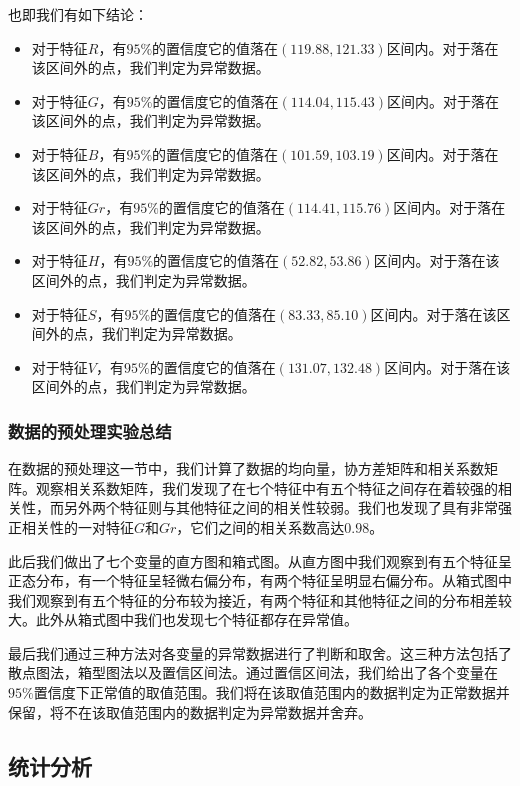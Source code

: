 \documentclass[UTF8]{ctexart}
\begin{document}
	也即我们有如下结论：
	\begin{itemize}
		\item 对于特征$R$，有$95\%$的置信度它的值落在$(119.88, 121.33)$区间内。对于落在该区间外的点，我们判定为异常数据。
		\item 对于特征$G$，有$95\%$的置信度它的值落在$(114.04, 115.43)$区间内。对于落在该区间外的点，我们判定为异常数据。
		\item 对于特征$B$，有$95\%$的置信度它的值落在$(101.59, 103.19)$区间内。对于落在该区间外的点，我们判定为异常数据。
		\item 对于特征$Gr$，有$95\%$的置信度它的值落在$(114.41, 115.76)$区间内。对于落在该区间外的点，我们判定为异常数据。
		\item 对于特征$H$，有$95\%$的置信度它的值落在$(52.82, 53.86)$区间内。对于落在该区间外的点，我们判定为异常数据。
		\item 对于特征$S$，有$95\%$的置信度它的值落在$(83.33, 85.10)$区间内。对于落在该区间外的点，我们判定为异常数据。
		\item 对于特征$V$，有$95\%$的置信度它的值落在$(131.07, 132.48)$区间内。对于落在该区间外的点，我们判定为异常数据。
	\end{itemize} 

	\subsubsection{数据的预处理实验总结}
	在数据的预处理这一节中，我们计算了数据的均向量，协方差矩阵和相关系数矩阵。观察相关系数矩阵，我们发现了在七个特征中有五个特征之间存在着较强的相关性，而另外两个特征则与其他特征之间的相关性较弱。我们也发现了具有非常强正相关性的一对特征$G$和$Gr$，它们之间的相关系数高达$0.98$。
	
	此后我们做出了七个变量的直方图和箱式图。从直方图中我们观察到有五个特征呈正态分布，有一个特征呈轻微右偏分布，有两个特征呈明显右偏分布。从箱式图中我们观察到有五个特征的分布较为接近，有两个特征和其他特征之间的分布相差较大。此外从箱式图中我们也发现七个特征都存在异常值。
	
	最后我们通过三种方法对各变量的异常数据进行了判断和取舍。这三种方法包括了散点图法，箱型图法以及置信区间法。通过置信区间法，我们给出了各个变量在$95\%$置信度下正常值的取值范围。我们将在该取值范围内的数据判定为正常数据并保留，将不在该取值范围内的数据判定为异常数据并舍弃。
	
	\subsection{统计分析}
	
\end{document}
